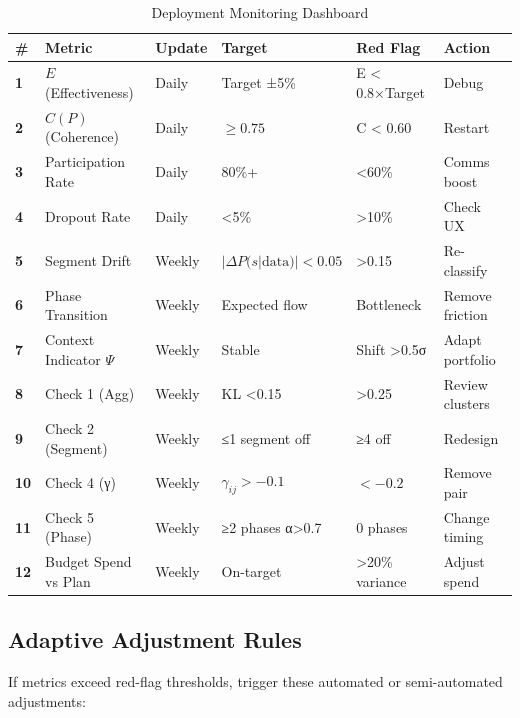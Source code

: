 \begin{table}[htbp]
\centering
\caption{Deployment Monitoring Dashboard}
\label{tab:20-deployment-dashboard}
\renewcommand{\arraystretch}{1.3}
\footnotesize
\begin{tabular}{@{}llllll@{}}
\toprule
\textbf{\#} & \textbf{Metric} & \textbf{Update} & \textbf{Target} & \textbf{Red Flag} & \textbf{Action} \\
\midrule
\textbf{1} & $E$ (Effectiveness) & Daily & Target ±5\% & E < 0.8×Target & Debug \\
\midrule
\textbf{2} & $C(P)$ (Coherence) & Daily & $\geq 0.75$ & C < 0.60 & Restart \\
\midrule
\textbf{3} & Participation Rate & Daily & 80\%+ & <60\% & Comms boost \\
\midrule
\textbf{4} & Dropout Rate & Daily & <5\% & >10\% & Check UX \\
\midrule
\textbf{5} & Segment Drift & Weekly & $|\Delta P(s|\text{data})|<0.05$ & >0.15 & Re-classify \\
\midrule
\textbf{6} & Phase Transition & Weekly & Expected flow & Bottleneck & Remove friction \\
\midrule
\textbf{7} & Context Indicator $\Psi$ & Weekly & Stable & Shift >0.5σ & Adapt portfolio \\
\midrule
\textbf{8} & Check 1 (Agg) & Weekly & KL <0.15 & >0.25 & Review clusters \\
\midrule
\textbf{9} & Check 2 (Segment) & Weekly & ≤1 segment off & ≥4 off & Redesign \\
\midrule
\textbf{10} & Check 4 (γ) & Weekly & $\gamma_{ij} > -0.1$ & $< -0.2$ & Remove pair \\
\midrule
\textbf{11} & Check 5 (Phase) & Weekly & ≥2 phases α>0.7 & 0 phases & Change timing \\
\midrule
\textbf{12} & Budget Spend vs Plan & Weekly & On-target & >20\% variance & Adjust spend \\
\bottomrule
\end{tabular}
\end{table}

\subsection{Adaptive Adjustment Rules}

If metrics exceed red-flag thresholds, trigger these automated or semi-automated adjustments:

